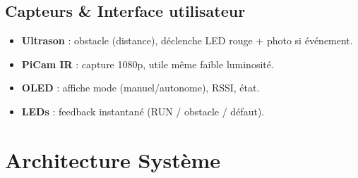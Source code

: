 \documentclass[a4paper,12pt]{report}
\begin{document}
\section{Capteurs \& Interface utilisateur}
\begin{itemize}
    \item \textbf{Ultrason} : obstacle (distance), déclenche LED rouge + photo si événement.
    \item \textbf{PiCam IR} : capture 1080p, utile même faible luminosité.
    \item \textbf{OLED} : affiche mode (manuel/autonome), RSSI, état.
    \item \textbf{LEDs} : feedback instantané (RUN / obstacle / défaut).
\end{itemize}

\chapter{Architecture Système}
\end{document}

